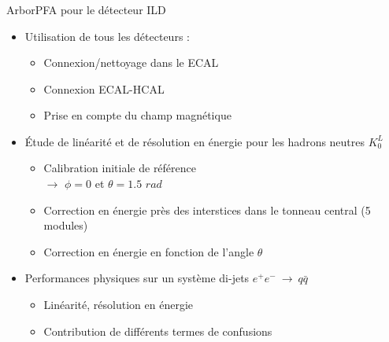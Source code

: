 \documentclass[8pt]{beamer}
\begin{document}
  \begin{frame}
  \frametitle{\secname}
    \tableofcontents[currentsection]
  \end{frame}

  \begin{frame}
  \frametitle{\secname}
  \framesubtitle{\subsecname}
    \begin{minipage}{0.53\linewidth}
      \begin{block}{ArborPFA pour le détecteur ILD}
        \begin{itemize}
          \item Utilisation de tous les détecteurs :
          \begin{itemize}
            \item Connexion/nettoyage dans le ECAL
            \item Connexion ECAL-HCAL
            \item Prise en compte du champ magnétique %
          \end{itemize}
          \item Étude de linéarité et de résolution en énergie pour les hadrons neutres $K_{0}^{L}$
          \begin{itemize}
            \item Calibration initiale de référence \\
            $\rightarrow$ $\phi=0$ et $\theta=1.5$ $rad$
            \item Correction en énergie près des interstices dans le tonneau central (5 modules)
            \item Correction en énergie en fonction de l'angle $\theta$
          \end{itemize}
          \item Performances physiques sur un système di-jets $e^+e^-~\rightarrow~q\bar{q}$
          \begin{itemize}
            \item Linéarité, résolution en énergie
            \item Contribution de différents termes de confusions
          \end{itemize}
        \end{itemize}
      \end{block}
    \end{minipage} ~~~~\hfill
    \begin{minipage}{0.43\linewidth}
      \begin{center}

\end{center}
\end{minipage}
\end{frame}
\end{document}
